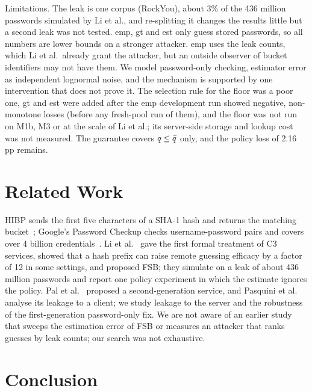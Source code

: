 Limitations. The leak is one corpus (RockYou), about 3\% of the 436 million passwords simulated by Li et al., and re-splitting it changes the results little but a second leak was not tested. emp, gt and est only guess stored passwords, so all numbers are lower bounds on a stronger attacker. emp uses the leak counts, which Li et al.\ already grant the attacker, but an outside observer of bucket identifiers may not have them. We model password-only checking, estimator error as independent lognormal noise, and the mechanism is supported by one intervention that does not prove it. The selection rule for the floor was a poor one, gt and est were added after the emp development run showed negative, non-monotone losses (before any fresh-pool run of them), and the floor was not run on M1b, M3 or at the scale of Li et al.; its server-side storage and lookup cost was not measured. The guarantee covers $q\le\bar q$ only, and the policy loss of 2.16 pp remains.

\section{Related Work}

HIBP sends the first five characters of a SHA-1 hash and returns the matching bucket~\cite{hunt}; Google's Password Checkup checks username-password pairs and covers over 4 billion credentials~\cite{thomas2019}. Li et al.~\cite{li2019} gave the first formal treatment of C3 services, showed that a hash prefix can raise remote guessing efficacy by a factor of 12 in some settings, and proposed FSB; they simulate on a leak of about 436 million passwords and report one policy experiment in which the estimate ignores the policy. Pal et al.~\cite{pal2022} proposed a second-generation service, and Pasquini et al.~\cite{pasquini2024} analyse its leakage to a client; we study leakage to the server and the robustness of the first-generation password-only fix. We are not aware of an earlier study that sweeps the estimation error of FSB or measures an attacker that ranks guesses by leak counts; our search was not exhaustive.

\section{Conclusion}

